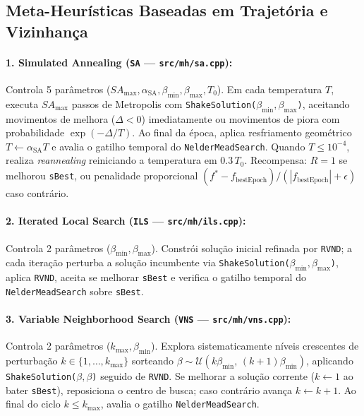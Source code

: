 \documentclass[11pt,a4paper]{article}
\begin{document}
\subsection{Meta-Heurísticas Baseadas em Trajetória e Vizinhança}

\paragraph{1. Simulated Annealing (\texttt{SA} --- \texttt{src/mh/sa.cpp}):}
Controla 5 parâmetros ($SA_{\max}, \alpha_{\text{SA}}, \beta_{\min}, \beta_{\max}, T_0$). Em cada temperatura $T$, executa $SA_{\max}$ passos de Metropolis com \texttt{ShakeSolution($\beta_{\min}, \beta_{\max}$)}, aceitando movimentos de melhora ($\Delta < 0$) imediatamente ou movimentos de piora com probabilidade $\exp(-\Delta/T)$. Ao final da época, aplica resfriamento geométrico $T \leftarrow \alpha_{\text{SA}} T$ e avalia o gatilho temporal do \texttt{NelderMeadSearch}. Quando $T \le 10^{-4}$, realiza \emph{reannealing} reiniciando a temperatura em $0.3\,T_0$. Recompensa: $R=1$ se melhorou \texttt{sBest}, ou penalidade proporcional $(f^* - f_{\text{bestEpoch}})/(|f_{\text{bestEpoch}}| + \epsilon)$ caso contrário.

\paragraph{2. Iterated Local Search (\texttt{ILS} --- \texttt{src/mh/ils.cpp}):}
Controla 2 parâmetros ($\beta_{\min}, \beta_{\max}$). Constrói solução inicial refinada por \texttt{RVND}; a cada iteração perturba a solução incumbente via \texttt{ShakeSolution($\beta_{\min}, \beta_{\max}$)}, aplica \texttt{RVND}, aceita se melhorar \texttt{sBest} e verifica o gatilho temporal do \texttt{NelderMeadSearch} sobre \texttt{sBest}.

\paragraph{3. Variable Neighborhood Search (\texttt{VNS} --- \texttt{src/mh/vns.cpp}):}
Controla 2 parâmetros ($k_{\max}, \beta_{\min}$). Explora sistematicamente níveis crescentes de perturbação $k \in \{1, \dots, k_{\max}\}$ sorteando $\beta \sim \mathcal{U}(k\beta_{\min},\, (k+1)\beta_{\min})$, aplicando \texttt{ShakeSolution($\beta, \beta$)} seguido de \texttt{RVND}. Se melhorar a solução corrente ($k \leftarrow 1$ ao bater \texttt{sBest}), reposiciona o centro de busca; caso contrário avança $k \leftarrow k + 1$. Ao final do ciclo $k \le k_{\max}$, avalia o gatilho \texttt{NelderMeadSearch}.
\end{document}

